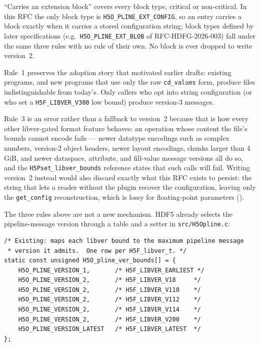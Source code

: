 \documentclass[../RFC-HDFG-2026-001.tex]{subfiles}
\begin{document}
``Carries an extension block'' covers every block type, critical or
non-critical.  In this RFC the only block type is
\texttt{H5O\_PLINE\_EXT\_CONFIG}, so an entry carries a block exactly when
it carries a stored configuration string; block types defined by later
specifications (e.g.\ \texttt{H5O\_PLINE\_EXT\_BLOB} of RFC-HDFG-2026-003)
fall under the same three rules with no rule of their own.  No block is
ever dropped to write version~2.

Rule~1 preserves the adoption story that motivated earlier drafts:
existing programs, and new programs that use only the raw
\texttt{cd\_values} form, produce files indistinguishable from today's.
Only callers who opt into string configuration (or who set a
\texttt{H5F\_LIBVER\_V300} low bound) produce version-3 messages.

Rule~3 is an error rather than a fallback to version~2 because that is how
every other libver-gated format feature behaves: an operation whose content
the file's bounds cannot encode fails --- newer datatype encodings such as
complex numbers, version-2 object headers, newer layout encodings, chunks
larger than 4\,GiB, and newer dataspace, attribute, and fill-value message
versions all do so, and the \texttt{H5Pset\_libver\_bounds} reference states
that such calls will fail.  Writing version~2 instead would also discard
exactly what this RFC exists to persist: the string that lets a reader
without the plugin recover the configuration, leaving only the
\texttt{get\_config} reconstruction, which is lossy for floating-point
parameters ().


The three rules above are not a new mechanism.  HDF5 already selects the
pipeline-message version through a table and a setter in
\texttt{src/H5Opline.c}:

\begin{verbatim}
/* Existing: maps each libver bound to the maximum pipeline message
 * version it admits.  One row per H5F_libver_t. */
static const unsigned H5O_pline_ver_bounds[] = {
    H5O_PLINE_VERSION_1,       /* H5F_LIBVER_EARLIEST */
    H5O_PLINE_VERSION_2,       /* H5F_LIBVER_V18     */
    H5O_PLINE_VERSION_2,       /* H5F_LIBVER_V110    */
    H5O_PLINE_VERSION_2,       /* H5F_LIBVER_V112    */
    H5O_PLINE_VERSION_2,       /* H5F_LIBVER_V114    */
    H5O_PLINE_VERSION_2,       /* H5F_LIBVER_V200    */
    H5O_PLINE_VERSION_LATEST   /* H5F_LIBVER_LATEST  */
};
\end{verbatim}
\end{document}
